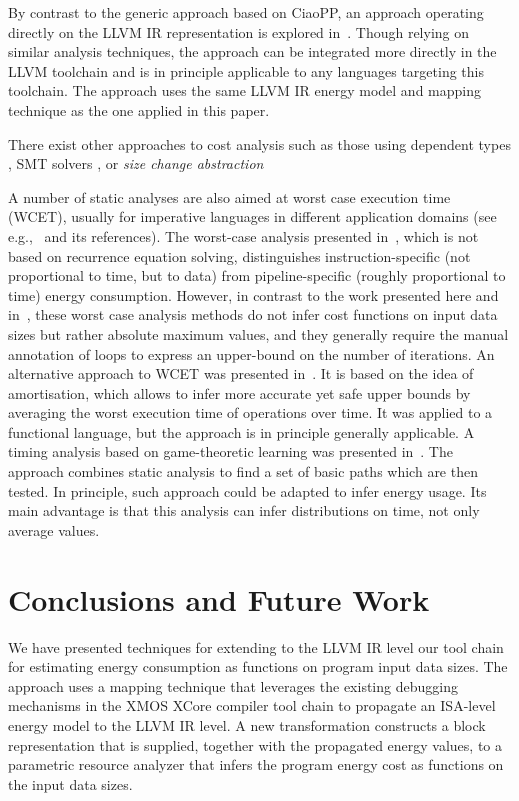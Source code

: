 \documentclass{llncs}
\newcommand{\level}{level\xspace}
\newcommand{\llvmir}{LLVM IR\xspace}
\newcommand{\ciaopp}{CiaoPP\xspace}
\begin{document}
By contrast to the generic approach based on \ciaopp, an approach operating directly
on the \llvmir representation is explored in~\cite{grech15}. Though relying on similar analysis
techniques, the approach can be integrated more directly in the LLVM
toolchain and is in principle applicable to any languages targeting
this toolchain. The approach uses the same \llvmir energy model and mapping technique
as the one applied in this paper.

There exist other approaches to cost analysis such as those using
dependent types \cite{DBLP:journals/toplas/0002AH12}, SMT solvers
\cite{Alonso2012}, or \emph{size change abstraction}
\cite{DBLP:journals/corr/abs-1203-5303}


A number of static analyses are also aimed at worst case execution time
(WCET), usually for imperative languages in different application
domains (see e.g.,~\cite{DBLP:journals/tecs/WilhelmEEHTWBFHMMPPSS08} and its
references). 
The worst-case analysis presented
in~\cite{DBLP:conf/rtas/JayaseelanML06}, which is not based on
recurrence equation solving, distinguishes instruction-specific (not
proportional to time, but to data) from pipeline-specific (roughly
proportional to time) energy consumption.
However, in contrast to the work presented here and
in~\cite{estim-exec-time-ppdp08}, these worst case analysis 
methods do not infer cost functions on input data sizes but rather
absolute maximum values, and they generally require the
manual annotation of loops to express an upper-bound on the number of
iterations.
An alternative approach to WCET was presented
in~\cite{Herrmann-WCET-2007}.  It is based on the idea of
amortisation, which allows to infer more accurate yet safe upper
bounds by averaging the worst execution time of operations over time.
It was applied to a functional language, but the approach is in
principle generally applicable.
A timing analysis based on game-theoretic learning was presented
in~\cite{DBLP:conf/tacas/SeshiaK11}. The approach combines static
analysis to find a set of basic paths which are then tested. In
principle, such approach could be adapted to infer energy usage. Its
main advantage is that this analysis can infer distributions on time,
not only average values.

\section{Conclusions and Future Work}
\label{sec:conclusions}

We have presented techniques for 
extending  
to the \llvmir \level our
tool chain for estimating energy consumption as functions on program
input data sizes. The approach uses a mapping technique that leverages
the existing debugging mechanisms in the XMOS XCore compiler tool
chain to propagate an ISA-\level energy model to the \llvmir
\level. A new transformation constructs a block representation that 
is supplied, together with the propagated energy values, to a parametric
resource analyzer that infers the program energy cost as functions on the
input data sizes.
\end{document}
